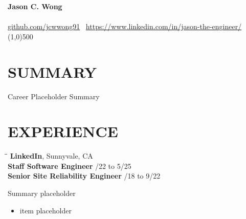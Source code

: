 \documentclass{res}
\begin{document}
{\centering
	\Large{\bf Jason C. Wong} \\
	\normalsize
	\myaddress \hspace{1pt} \textbullet \hspace{1pt}
	\myphone
	\hspace{1pt} \textbullet \hspace{1pt} \myemail \\
	\href{https://github.com/jcwwong91}{github.com/jcwwong91}
	\textbullet\
	\href{https://www.linkedin.com/in/jason-the-engineer}{https://www.linkedin.com/in/jason-the-engineer/}
	\footnotesize
	\line(1,0){500} \\
}

\normalsize
\begin{resume}

\vspace{-15pt}
\section{SUMMARY}
	Career Placeholder Summary %

\vspace{-10pt}
\section{EXPERIENCE}
   \vspace{-0.1in}	
   
   \begin{tabbing}
   	\hspace{2.3in}\= \hspace{2.6in}\= \kill %
   	{\bf LinkedIn}, Sunnyvale, CA \\
	{\bf Staff Software Engineer} \> /22 to 5/25 \\
	{\bf Senior Site Reliability Engineer} \> /18 to 9/22 \\
  \end{tabbing}\vspace{-32pt}      %
   Summary placeholder%
   \vspace{2pt}
   \begin{itemize}\addtolength{\itemsep}{-0.5\baselineskip}
	\item  item placeholder %
   \end{itemize}
   

\end{resume}
\end{document}
